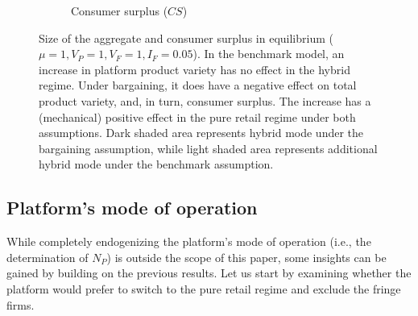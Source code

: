 \documentclass[a4paper]{article}
\begin{document}
\begin{figure}
\begin{subfigure}[b]{0.45\textwidth}
        \caption{Consumer surplus ($CS$)}
        \label{fig:welfare_consumer_surplus}
    \end{subfigure}
    \caption{Size of the aggregate and consumer surplus in equilibrium ($\mu = 1, V_P = 1, V_F = 1, I_F = 0.05$). In the benchmark model, an increase in platform product variety has no effect in the hybrid regime. Under bargaining, it does have a negative effect on total product variety, and, in turn, consumer surplus. The increase has a (mechanical) positive effect in the pure retail regime under both assumptions. Dark shaded area represents hybrid mode under the bargaining assumption, while light shaded area represents additional hybrid mode under the benchmark assumption.}
    \label{fig:welfare}
\end{figure}


\subsection{Platform's mode of operation}
\label{sec:endogenizing_n_p}

While completely endogenizing the platform's mode of operation (i.e., the determination of $N_P$) is outside the scope of this paper, some insights can be gained by building on the previous results.
Let us start by examining whether the platform would prefer to switch to the pure retail regime and exclude the fringe firms.
\end{document}
